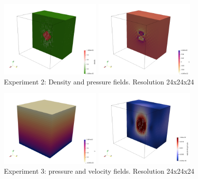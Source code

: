 \begin{center}
\includegraphics[width=5cm]{python_codes/fieldstone_10/results/dens_2}
\includegraphics[width=5cm]{python_codes/fieldstone_10/results/press_2}\\
{\small Experiment 2: Density and pressure fields. Resolution 24x24x24}
\end{center}


\begin{center}
\includegraphics[width=5cm]{python_codes/fieldstone_10/results/press_3}
\includegraphics[width=5cm]{python_codes/fieldstone_10/results/vel_3}\\
{\small Experiment 3: pressure and velocity fields. Resolution 24x24x24}
\end{center}

